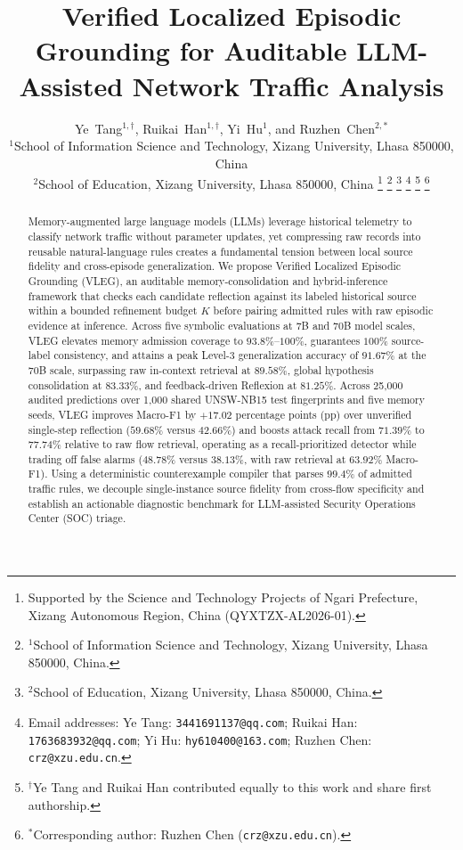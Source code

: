 \documentclass[journal]{IEEEtran}
\theoremstyle{definition}
\theoremstyle{remark}
\begin{document}
\title{Verified Localized Episodic Grounding for Auditable LLM-Assisted Network Traffic Analysis}
\author{Ye~Tang$^{1,\dagger}$, Ruikai~Han$^{1,\dagger}$, Yi~Hu$^{1}$, and Ruzhen~Chen$^{2,*}$\\[0.4em]
{\normalsize $^{1}$School of Information Science and Technology, Xizang University, Lhasa 850000, China}\\
{\normalsize $^{2}$School of Education, Xizang University, Lhasa 850000, China}%
\thanks{Supported by the Science and Technology Projects of Ngari Prefecture, Xizang Autonomous Region, China (QYXTZX-AL2026-01).}%
\thanks{$^{1}$School of Information Science and Technology, Xizang University, Lhasa 850000, China.}%
\thanks{$^{2}$School of Education, Xizang University, Lhasa 850000, China.}%
\thanks{Email addresses: Ye Tang: \texttt{3441691137@qq.com}; Ruikai Han: \texttt{1763683932@qq.com}; Yi Hu: \texttt{hy610400@163.com}; Ruzhen Chen: \texttt{crz@xzu.edu.cn}.}%
\thanks{$^{\dagger}$Ye Tang and Ruikai Han contributed equally to this work and share first authorship.}%
\thanks{$^{*}$Corresponding author: Ruzhen Chen (\texttt{crz@xzu.edu.cn}).}%
}
\maketitle
\begin{abstract}
Memory-augmented large language models (LLMs) leverage historical telemetry to classify network traffic without parameter updates, yet compressing raw records into reusable natural-language rules creates a fundamental tension between local source fidelity and cross-episode generalization. We propose Verified Localized Episodic Grounding (VLEG), an auditable memory-consolidation and hybrid-inference framework that checks each candidate reflection against its labeled historical source within a bounded refinement budget $K$ before pairing admitted rules with raw episodic evidence at inference. Across five symbolic evaluations at 7B and 70B model scales, VLEG elevates memory admission coverage to $93.8\%$--$100\%$, guarantees $100\%$ source-label consistency, and attains a peak Level-3 generalization accuracy of $91.67\%$ at the 70B scale, surpassing raw in-context retrieval at $89.58\%$, global hypothesis consolidation at $83.33\%$, and feedback-driven Reflexion at $81.25\%$. Across 25,000 audited predictions over 1,000 shared UNSW-NB15 test fingerprints and five memory seeds, VLEG improves Macro-F1 by $+17.02$ percentage points (pp) over unverified single-step reflection ($59.68\%$ versus $42.66\%$) and boosts attack recall from $71.39\%$ to $77.74\%$ relative to raw flow retrieval, operating as a recall-prioritized detector while trading off false alarms ($48.78\%$ versus $38.13\%$, with raw retrieval at $63.92\%$ Macro-F1). Using a deterministic counterexample compiler that parses $99.4\%$ of admitted traffic rules, we decouple single-instance source fidelity from cross-flow specificity and establish an actionable diagnostic benchmark for LLM-assisted Security Operations Center (SOC) triage.
\end{abstract}
\end{document}
